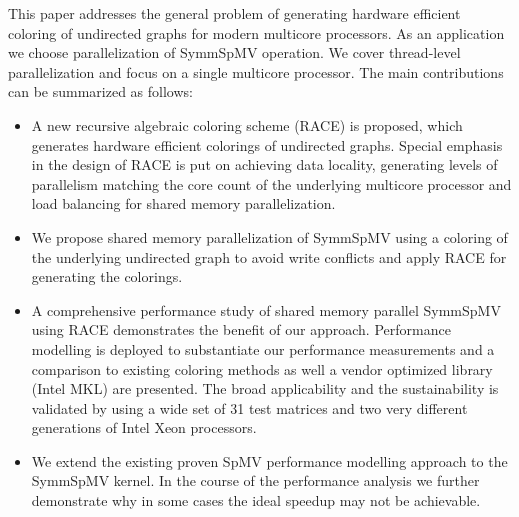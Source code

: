 

This paper addresses the general problem of generating hardware efficient \DK coloring
 of undirected graphs for modern multicore processors. As an application we 
 choose parallelization of \acrshort{SymmSpMV} operation. We cover thread-level 
 parallelization and focus on a single multicore processor. The main contributions
  can be summarized as follows: 
\begin{itemize}
\item A new recursive algebraic coloring scheme (RACE) is proposed, 
which generates hardware efficient \DK colorings of undirected graphs. 
Special emphasis in the design of RACE is put on achieving data locality, 
generating levels of parallelism matching the core count of the underlying 
multicore processor and load balancing for shared memory parallelization.
\item We propose shared memory parallelization of \acrshort{SymmSpMV}  
using a \DTWO coloring of the underlying undirected graph to avoid
 write conflicts and apply RACE for generating the colorings.
\item A comprehensive performance study of shared memory parallel \acrshort{SymmSpMV} 
using RACE demonstrates the benefit of our approach. Performance modelling
 is deployed to substantiate our performance measurements and a comparison to
  existing coloring methods as well a vendor optimized library (Intel MKL) 
  are presented. The broad applicability and the sustainability is validated 
  by using a wide set of 31 test matrices and two very different generations 
  of Intel Xeon processors.
\item We extend the existing proven \acrshort{SpMV} performance modelling approach
 to the \acrshort{SymmSpMV} kernel. 
In the course of the 
 performance analysis we further demonstrate why in some cases the ideal speedup
 may not be achievable.

\end{itemize}
